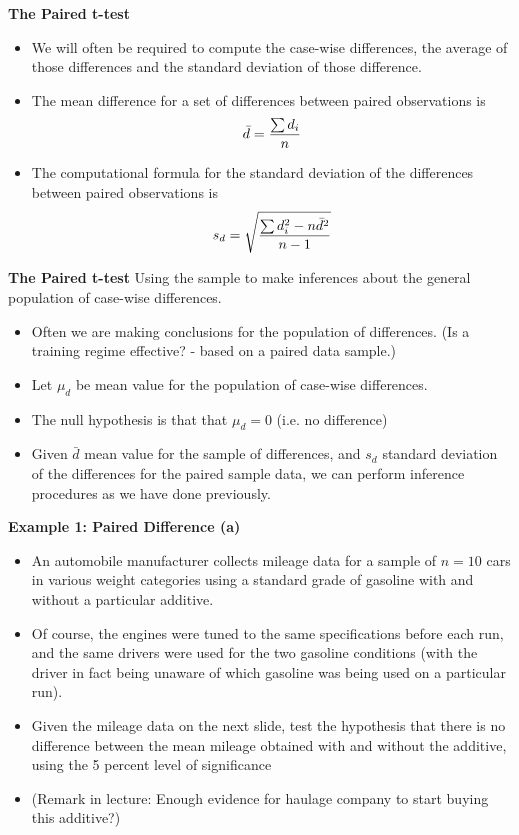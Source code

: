 \documentclass[a4]{beamer}
\begin{document}
\noindent \textbf{The Paired t-test}
\begin{itemize}
\item We will often be required to compute the case-wise differences, the average of those differences and the standard deviation of those difference.

\item The mean difference for a set of differences between paired observations is
\[ \bar{d} = {\sum d_i \over n }\]

\item The computational formula for the standard deviation of the differences
between paired observations is
\[s_d = \sqrt{ {\sum d_i^2 - n\bar{d}^2 \over n-1}}\]
\end{itemize}



{
\noindent \textbf{The Paired t-test}
Using the sample to make inferences about the general population of case-wise differences.
\begin{itemize}
\item Often we are making conclusions for the population of differences. (Is a training regime effective? - based on a paired data sample.)
\item Let $\mu_d$ be mean value for the population of case-wise differences.
\item The null hypothesis is that that $\mu_d = 0$ (i.e. no difference)
\item Given $\bar{d}$ mean value for the sample of differences, and $s_d$ standard deviation of the differences for the paired sample data, we can perform inference procedures as we have done previously.
\end{itemize}
}


\noindent \textbf{Example 1: Paired Difference (a)}
\begin{itemize}
\item An automobile manufacturer collects mileage data for a sample of $n = 10$ cars in various weight categories
using a standard grade of gasoline with and without a particular additive. \item Of course, the engines were tuned to the same
specifications before each run, and the same drivers were used for the two gasoline conditions (with the driver in fact being
unaware of which gasoline was being used on a particular run). \item Given the mileage data on the next slide,  test the hypothesis
that there is no difference between the mean mileage obtained with and without the additive, using the 5 percent level of
significance \item (Remark in lecture: Enough evidence for haulage company to start buying this additive?) \end{itemize}
\end{document}

